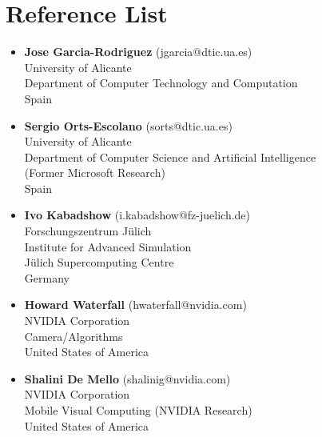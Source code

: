 \documentclass[8pt]{article}
\begin{document}
\section*{Reference List}
\begin{itemize}
	\item {\textbf{Jose Garcia-Rodriguez} (jgarcia@dtic.ua.es)\\
    University of Alicante\\
    Department of Computer Technology and Computation\\
    Spain\\}
	\item {\textbf{Sergio Orts-Escolano} (sorts@dtic.ua.es)\\
University of Alicante\\
		Department of Computer Science and Artificial Intelligence\\
		(Former Microsoft Research)\\
		Spain\\}

  \item {\textbf{Ivo Kabadshow} (i.kabadshow@fz-juelich.de)\\
    Forschungszentrum Jülich\\
    Institute for Advanced Simulation\\
    Jülich Supercomputing Centre\\
    Germany\\}

  \item {\textbf{Howard Waterfall} (hwaterfall@nvidia.com)\\
	NVIDIA Corporation\\
	Camera/Algorithms\\
	United States of America\\}

  \item{\textbf{Shalini De Mello} (shalinig@nvidia.com)\\
	NVIDIA Corporation\\
	Mobile Visual Computing (NVIDIA Research)\\
	United States of America\\}

\end{itemize}
 
\end{document}
